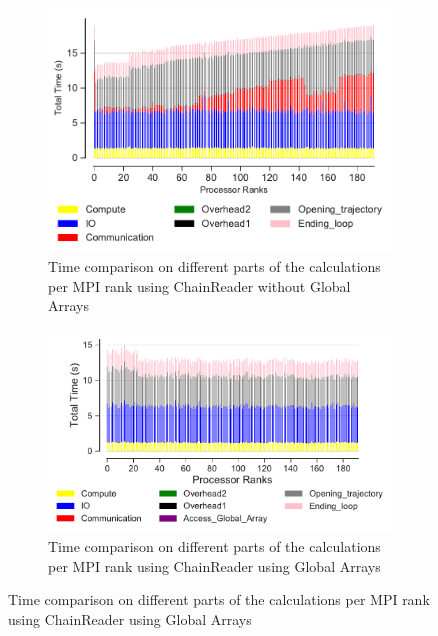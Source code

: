 \begin{figure}[ht!]
\begin{subfigure} {.45\textwidth}
  \includegraphics[width=\linewidth]{figures/chain-reader-no-ga-BarPlot-rank-comparison_192_5.pdf}
   \caption{Time comparison on different parts of the calculations per MPI rank using ChainReader without Global Arrays}
  \label{fig:MPIranks-split-chain-reader}
\end{subfigure}
\hfill
\begin{subfigure} {.45\textwidth}
  \includegraphics[width=\linewidth]{figures/chain-reader-ga-BarPlot-rank-comparison_192_3.pdf}
  \caption{Time comparison on different parts of the calculations per MPI rank using ChainReader using Global Arrays}
  \label{fig:MPIranks-split-ga-chain-reader}
\end{subfigure}


\end{figure}
